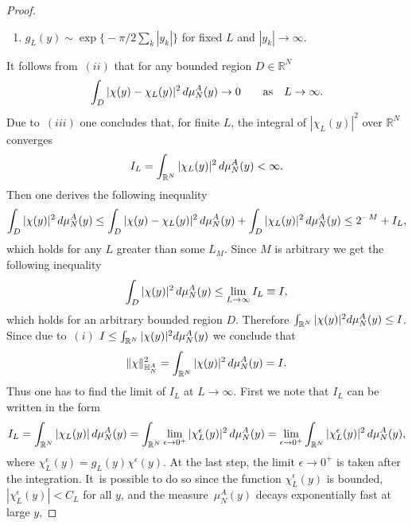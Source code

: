 \documentclass[11pt]{article}
\numberwithin{equation}{section}
\numberwithin{equation}{section}
\begin{document}
\begin{proof}
\begin{enumerate}[label=($\roman*$)]
\item $g_L(y)\sim \exp\big\{-\pi/2\sum_k |y_k|\big\}$ for fixed $L$ and $|y_k|\to\infty$.\label{iii}

\end{enumerate}

It follows from~$(ii)$ that for any bounded region $D\in \mathbb R^{N}$
\begin{gather*}
\int_D |\chi(y)-\chi_L(y)|^2 \,{\rm d}\mu_N^A(y) \to 0 \qquad \text{as} \quad L\to\infty.
\end{gather*}
 Due to~$(iii)$ one concludes that, for finite $L$, the integral of $|\chi_L(y)|^2$ over $\mathbb R^N$ converges
\begin{gather*}
I_L=\int_{\mathbb R^N} |\chi_L(y)|^2\, {\rm d}\mu_N^A(y)<\infty.
\end{gather*}
Then one derives the following inequality
\begin{gather*}
\int_{D} |\chi(y)|^2\, {\rm d}\mu_N^A(y) \leq \int_D |\chi(y)-\chi_L(y)|^2\, {\rm d}\mu_N^A(y)+ \int_D |\chi_L(y)|^2\, {\rm d}\mu_N^A(y)\leq 2^{-M} + I_L,
\end{gather*}
which holds for any $L$ greater than some $L_M$. Since $M$ is arbitrary we get the following inequality
\begin{gather*}%
\int_{D} |\chi(y)|^2 \,{\rm d}\mu_N^A(y)\leq \lim_{L\to\infty} I_L\equiv I,
\end{gather*}
which holds for an arbitrary bounded region $D$. Therefore $\int_{\mathbb R^N} |\chi(y)|^2 {\rm d}\mu_N^A(y)\leq I$. Since due to~$(i)$
$I\leq\int_{\mathbb R^N} |\chi(y)|^2 {\rm d}\mu_N^A(y)$ we conclude that
\begin{gather*}
\|\chi\|^2_{\mathbb H_N^A}=\int_{\mathbb R^N} |\chi(y)|^2\, {\rm d}\mu_N^A(y) = I.
\end{gather*}
Thus one has to find the limit of $I_L$ at $L\to\infty$. First we note that $I_L$ can be written in the form
\begin{gather*}
I_L=\int_{\mathbb R^N} |\chi_L(y)|\,{\rm d}\mu_N^A(y)=\int_{\mathbb R^N}\lim_{\epsilon\to 0^+} |\chi_L^\epsilon(y)|^2\,{\rm d}\mu_N^A(y)=
\lim_{\epsilon\to 0^+}\int_{\mathbb R^N}|\chi_L^\epsilon(y)|^2\, {\rm d}\mu_N^A(y),
\end{gather*}
where $\chi_L^\epsilon(y)=g_L(y)\chi^\epsilon(y)$. At the last step, the limit $\epsilon\to 0^+$ is taken after the integration. It~is
possible to do so since the function $\chi_L^\epsilon(y)$ is bounded, $|\chi_L^\epsilon(y)|<C_L$ for all $y$, and the measure~$\mu_N^A(y)$
decays exponentially fast at large $y$,

\end{proof}
\end{document}
